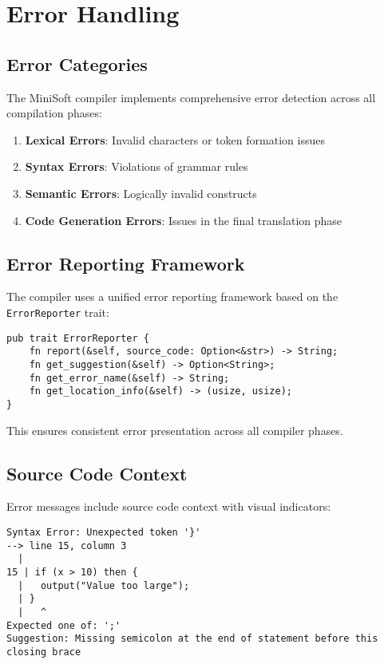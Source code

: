 \documentclass[12pt,a4paper]{article}
\begin{document}
\section{Error Handling}
\subsection{Error Categories}
The MiniSoft compiler implements comprehensive error detection across all compilation phases:

\begin{enumerate}
	\item \textbf{Lexical Errors}: Invalid characters or token formation issues
	\item \textbf{Syntax Errors}: Violations of grammar rules
	\item \textbf{Semantic Errors}: Logically invalid constructs
	\item \textbf{Code Generation Errors}: Issues in the final translation phase
\end{enumerate}

\subsection{Error Reporting Framework}
The compiler uses a unified error reporting framework based on the \texttt{ErrorReporter} trait:

\begin{lstlisting}[caption={Error Reporter Interface}]
pub trait ErrorReporter {
    fn report(&self, source_code: Option<&str>) -> String;
    fn get_suggestion(&self) -> Option<String>;
    fn get_error_name(&self) -> String;
    fn get_location_info(&self) -> (usize, usize);
}
\end{lstlisting}

This ensures consistent error presentation across all compiler phases.

\subsection{Source Code Context}
Error messages include source code context with visual indicators:

\begin{lstlisting}[caption={Error with Source Context}]
Syntax Error: Unexpected token '}'
--> line 15, column 3
  |
15 | if (x > 10) then {
  |   output("Value too large");
  | }
  |   ^
Expected one of: ';'
Suggestion: Missing semicolon at the end of statement before this closing brace
\end{lstlisting}
\end{document}
